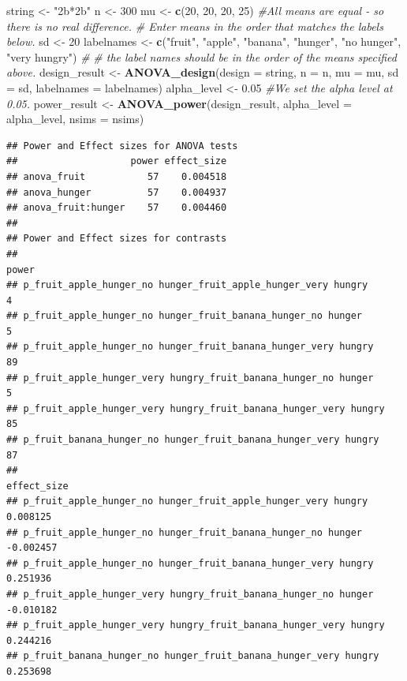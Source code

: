 \documentclass[]{book}
\newenvironment{Shaded}{\begin{snugshade}}{\end{snugshade}}
\newcommand{\CommentTok}[1]{\textcolor[rgb]{0.56,0.35,0.01}{\textit{#1}}}
\newcommand{\DataTypeTok}[1]{\textcolor[rgb]{0.13,0.29,0.53}{#1}}
\newcommand{\DecValTok}[1]{\textcolor[rgb]{0.00,0.00,0.81}{#1}}
\newcommand{\FloatTok}[1]{\textcolor[rgb]{0.00,0.00,0.81}{#1}}
\newcommand{\KeywordTok}[1]{\textcolor[rgb]{0.13,0.29,0.53}{\textbf{#1}}}
\newcommand{\NormalTok}[1]{#1}
\newcommand{\StringTok}[1]{\textcolor[rgb]{0.31,0.60,0.02}{#1}}
\begin{document}
\begin{Shaded}
\begin{Highlighting}[]
\NormalTok{string <-}\StringTok{ "2b*2b"}
\NormalTok{n <-}\StringTok{ }\DecValTok{300}
\NormalTok{mu <-}\StringTok{ }\KeywordTok{c}\NormalTok{(}\DecValTok{20}\NormalTok{, }\DecValTok{20}\NormalTok{, }\DecValTok{20}\NormalTok{, }\DecValTok{25}\NormalTok{) }\CommentTok{#All means are equal - so there is no real difference.}
\CommentTok{# Enter means in the order that matches the labels below.}
\NormalTok{sd <-}\StringTok{ }\DecValTok{20}
\NormalTok{labelnames <-}\StringTok{ }\KeywordTok{c}\NormalTok{(}\StringTok{"fruit"}\NormalTok{, }\StringTok{"apple"}\NormalTok{, }\StringTok{"banana"}\NormalTok{, }\StringTok{"hunger"}\NormalTok{, }\StringTok{"no hunger"}\NormalTok{, }\StringTok{"very hungry"}\NormalTok{) }\CommentTok{#}
\CommentTok{# the label names should be in the order of the means specified above.}
\NormalTok{design_result <-}\StringTok{ }\KeywordTok{ANOVA_design}\NormalTok{(}\DataTypeTok{design =}\NormalTok{ string,}
                   \DataTypeTok{n =}\NormalTok{ n, }
                   \DataTypeTok{mu =}\NormalTok{ mu, }
                   \DataTypeTok{sd =}\NormalTok{ sd, }
                   \DataTypeTok{labelnames =}\NormalTok{ labelnames)}
\NormalTok{alpha_level <-}\StringTok{ }\FloatTok{0.05} \CommentTok{#We set the alpha level at 0.05. }
\NormalTok{power_result <-}\StringTok{ }\KeywordTok{ANOVA_power}\NormalTok{(design_result, }\DataTypeTok{alpha_level =}\NormalTok{ alpha_level, }\DataTypeTok{nsims =}\NormalTok{ nsims)}
\end{Highlighting}
\end{Shaded}

\begin{verbatim}
## Power and Effect sizes for ANOVA tests
##                    power effect_size
## anova_fruit           57    0.004518
## anova_hunger          57    0.004937
## anova_fruit:hunger    57    0.004460
## 
## Power and Effect sizes for contrasts
##                                                                  power
## p_fruit_apple_hunger_no hunger_fruit_apple_hunger_very hungry        4
## p_fruit_apple_hunger_no hunger_fruit_banana_hunger_no hunger         5
## p_fruit_apple_hunger_no hunger_fruit_banana_hunger_very hungry      89
## p_fruit_apple_hunger_very hungry_fruit_banana_hunger_no hunger       5
## p_fruit_apple_hunger_very hungry_fruit_banana_hunger_very hungry    85
## p_fruit_banana_hunger_no hunger_fruit_banana_hunger_very hungry     87
##                                                                  effect_size
## p_fruit_apple_hunger_no hunger_fruit_apple_hunger_very hungry       0.008125
## p_fruit_apple_hunger_no hunger_fruit_banana_hunger_no hunger       -0.002457
## p_fruit_apple_hunger_no hunger_fruit_banana_hunger_very hungry      0.251936
## p_fruit_apple_hunger_very hungry_fruit_banana_hunger_no hunger     -0.010182
## p_fruit_apple_hunger_very hungry_fruit_banana_hunger_very hungry    0.244216
## p_fruit_banana_hunger_no hunger_fruit_banana_hunger_very hungry     0.253698
\end{verbatim}
\end{document}
